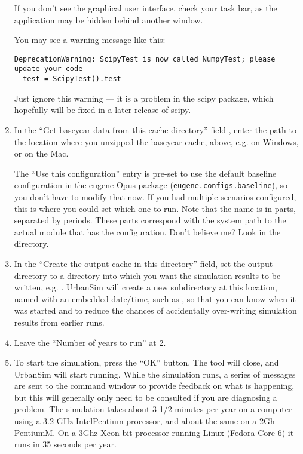 \documentclass{howto}
\begin{document}
\begin{enumerate}
If you don't see the graphical user interface, check your task bar, as the
application may be hidden behind another window.

You may see a warning message like this: 
\begin{verbatim}
DeprecationWarning: ScipyTest is now called NumpyTest; please update your code
  test = ScipyTest().test
\end{verbatim}
Just ignore this warning --- it is a problem in the scipy package, which hopefully will be 
fixed in a later release of scipy.

\item In the ``Get baseyear data from this cache directory'' field , enter the
path to the location where you unzipped the
baseyear cache, above, e.g. 
on Windows, or
 on the Mac.

The ``Use this configuration'' entry is pre-set to use the
default baseline configuration in the eugene Opus package
(\verb|eugene.configs.baseline|), so you don't have to modify that
now.  If you had multiple scenarios configured, this is where you
could set which one to run.  Note that the name is in parts,
separated by periods.  These parts correspond with the system path
to the actual module that has the configuration.  Don't believe me?
Look in the  directory.

\item In the ``Create the output cache in this directory'' field, set the
output directory to a directory into which you want the simulation results to be
written, e.g. . UrbanSim will
create a new subdirectory at this location, named with an embedded date/time, such as
, so that you can know when it was
started and to reduce the chances of accidentally over-writing
simulation results from earlier runs.

\item Leave the ``Number of years to run'' at 2.

\item To start the simulation, press the ``OK'' button.  The tool will
close, and UrbanSim will start running. While the simulation runs, a
series of messages are sent to the command window to provide
feedback on what is happening, but this will generally only need to
be consulted if you are diagnosing a problem. The simulation takes
about 3 1/2 minutes per year on a computer using a 3.2 GHz
Intel\textregistered Pentium processor, and about
the same on a 2Gh Pentium\textregistered M.  On a 3Ghz
Xeon-bit processor running Linux (Fedora Core 6)
it runs in 35 seconds per year.


\end{enumerate}
\end{document}
